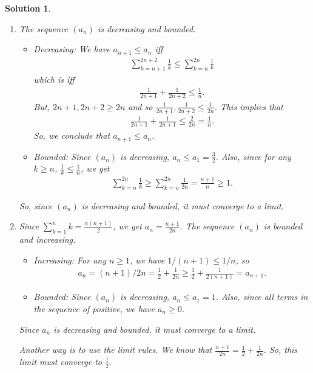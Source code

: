 \documentclass[12pt]{article}
\theoremstyle{plain}
\theoremstyle{plain}
\newtheorem*{sol}{\textbf{Solution}}}
\theoremstyle{plain}
\theoremstyle{plain}
\begin{document}
\begin{sol}
\begin{enumerate}
\item The sequence $(a_n)$ is decreasing and bounded. 
	\begin{itemize}
	\item Decreasing: We have $a_{n+ 1} \leq a_n$ iff
		\begin{align*}
		\sum_{k = n+1}^{2n+2} \frac{1}{k} \leq \sum_{k = n}^{2n} \frac{1}{k}
		\end{align*}
	which is iff
		\begin{align*}
		\frac{1}{2n + 1} + \frac{1}{2n + 2} \leq \frac{1}{n} .
		\end{align*}
	But, $2n + 1, 2n + 2 \geq 2n$ and so $\frac{1}{2n + 1}, \frac{1}{2n + 2} \leq \frac{1}{2n}$. This implies that
		\begin{align*}
		\frac{1}{2n + 1} + \frac{1}{2n + 1} \leq \frac{2}{2n} = \frac{1}{n}.
		\end{align*}
	So, we conclude that $a_{n+ 1} \leq a_n$.
	\item Bounded: Since $(a_n)$ is decreasing, $a_n \leq a_1 = \frac{3}{2}$. Also, since for any $k \geq n$, $\frac{1}{k} \leq \frac{1}{n}$, we get
		\begin{align*}
		\sum_{k = n}^{2n} \frac{1}{k} \geq \sum_{k = n}^{2n} \frac{1}{2n} = \frac{n + 1}{n} \geq 1.
		\end{align*}
	\end{itemize}
So, since $(a_n)$ is decreasing and bounded, it must converge to a limit.
\item Since $\sum_{k = 1}^n k = \frac{n (n + 1)}{2}$, we get $a_n = \frac{n + 1}{2n}$. The sequence $(a_n)$ is bounded and increasing.
	\begin{itemize}
	\item Increasing: For any $n \geq 1$, we have $1/(n + 1) \leq 1/n$, so
		\begin{align*}
		a_n= (n+ 1)/2n = \frac{1}{2} + \frac{1}{2n} \geq \frac{1}{2} + \frac{1}{2 (n + 1)} = a_{n + 1} .
		\end{align*}
	\item Bounded: Since $(a_n)$ is decreasing, $a_n \leq a_1 = 1$. Also, since all terms in the sequence of positive, we have $a_n \geq 0$. 
	\end{itemize}
Since $a_n$ is decreasing and bounded, it must converge to a limit.

Another way is to use the limit rules. We know that $\frac{n + 1}{2n} = \frac{1}{2} + \frac{1}{2n}$. So, this limit must converge to $\frac{1}{2}$.
\end{enumerate}
\end{sol}
\end{document}
